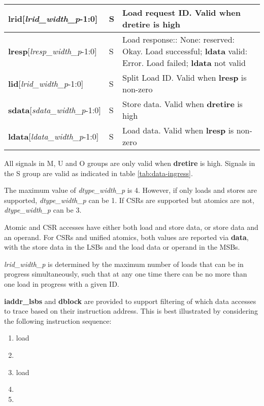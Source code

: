 \begin{table}[htp]
\begin{tabulary}{\textwidth}{|l|l|p{80mm}|}
        \hline
        \textbf{lrid}[\textit{lrid\_width\_p}-1:0] & S & Load request ID. Valid when \textbf{dretire} is high\\
        \hline        
        \textbf{lresp}[\textit{lresp\_width\_p}-1:0] & S & Load response:: None: reserved: Okay.  Load successful; \textbf{ldata} valid: Error. Load failed; \textbf{ldata} not valid\\
        \hline        
        \textbf{lid}[\textit{lrid\_width\_p}-1:0] & S & Split Load ID. Valid when \textbf{lresp} is non-zero\\
        \hline        
        \textbf{sdata}[\textit{sdata\_width\_p}-1:0] & S & Store data. Valid when \textbf{dretire} is high\\
        \hline        
        \textbf{ldata}[\textit{ldata\_width\_p}-1:0] & S & Load data. Valid when \textbf{lresp} is non-zero\\
        \hline        
    \end{tabulary}
\end{table}

All signals in M, U and O groups are only valid when \textbf{dretire} is high.  Signals in the S group are valid as
indicated in table \ref{tab:data-ingress}.

The maximum value of \textit{dtype\_width\_p} is 4.  However, if only loads and stores are supported, 
\textit{dtype\_width\_p} can be 1.  If CSRs are supported but atomics are not, \textit{dtype\_width\_p} can be 3.

Atomic and CSR accesses have either both load and store data, or store data and an operand.  For CSRs and unified
atomics, both values are reported via \textbf{data}, with the store data in the LSBs and the load data or operand
in the MSBs.

\textit{lrid\_width\_p} is determined by the maximum number of loads that can be in progress simultaneously, such
that at any one time there can be no more than one load in progress with a given ID.

\textbf{iaddr\_lsbs} and \textbf{dblock} are provided to support filtering of which data accesses to trace
based on their instruction address.  This is best illustrated by considering the following instruction sequence:

\begin{enumerate}
  \item load
  \item <some non data access instruction>
  \item load
  \item <some non data access instruction>
  \item <some non data access instruction>
\end{enumerate}
 
